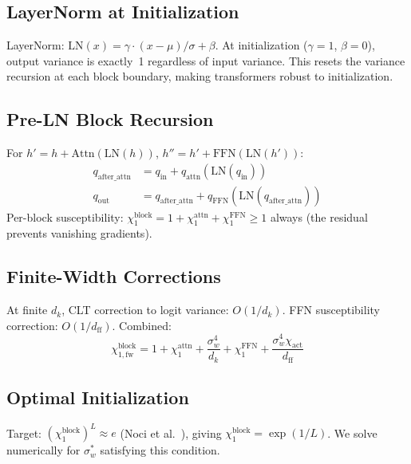 \documentclass[10pt]{article}
\begin{document}
\subsection{LayerNorm at Initialization}

LayerNorm: $\text{LN}(x) = \gamma \cdot (x - \mu)/\sigma + \beta$.
At initialization ($\gamma = 1$, $\beta = 0$), output variance is exactly~1 regardless of input variance.
This resets the variance recursion at each block boundary, making transformers robust to initialization.

\subsection{Pre-LN Block Recursion}

For $h' = h + \text{Attn}(\text{LN}(h))$, $h'' = h' + \text{FFN}(\text{LN}(h'))$:
\begin{align}
    q_{\text{after\_attn}} &= q_{\text{in}} + q_{\text{attn}}(\text{LN}(q_{\text{in}})) \\
    q_{\text{out}} &= q_{\text{after\_attn}} + q_{\text{FFN}}(\text{LN}(q_{\text{after\_attn}}))
\end{align}
Per-block susceptibility: $\chi_1^{\text{block}} = 1 + \chi_1^{\text{attn}} + \chi_1^{\text{FFN}} \geq 1$ always (the residual prevents vanishing gradients).

\subsection{Finite-Width Corrections}

At finite $d_k$, CLT correction to logit variance: $O(1/d_k)$.
FFN susceptibility correction: $O(1/d_{\text{ff}})$.
Combined:
\begin{equation}
    \chi_{1,\text{fw}}^{\text{block}} = 1 + \chi_1^{\text{attn}} + \frac{\sigma_w^4}{d_k} + \chi_1^{\text{FFN}} + \frac{\sigma_w^4 \chi_{\text{act}}}{d_{\text{ff}}}
\end{equation}

\subsection{Optimal Initialization}

Target: $(\chi_1^{\text{block}})^L \approx e$ (Noci et al.~\cite{noci2022signal}), giving $\chi_1^{\text{block}} = \exp(1/L)$.
We solve numerically for $\sigma_w^*$ satisfying this condition.

\end{document}

